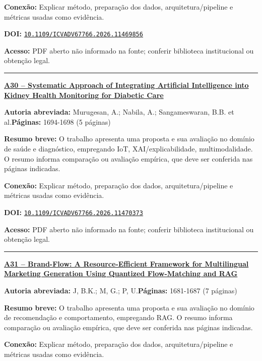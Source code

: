 \documentclass[10pt,a4paper]{article}
\begin{document}
\textbf{Conexão:} Explicar método, preparação dos dados, arquitetura/pipeline e métricas usadas como evidência.\par
\textbf{DOI:} \href{https://doi.org/10.1109/ICVADV67766.2026.11469856}{\nolinkurl{10.1109/ICVADV67766.2026.11469856}}\par
\textbf{Acesso:} PDF aberto não informado na fonte; conferir biblioteca institucional ou obtenção legal.\par
\noindent\rule{\textwidth}{0.35pt}
\par\medskip\noindent
{\large\bfseries\href{https://doi.org/10.1109/ICVADV67766.2026.11470373}{A30 -- Systematic Approach of Integrating Artificial Intelligence into Kidney Health Monitoring for Diabetic Care}}\par\smallskip
\textbf{Autoria abreviada:} Murugesan, A.; Nabila, A.; Sangameswaran, B.B. et al.\quad \textbf{Páginas:} 1694-1698 (5 páginas)\par
\textbf{Resumo breve:} O trabalho apresenta uma proposta e sua avaliação no domínio de saúde e diagnóstico, empregando IoT, XAI/explicabilidade, multimodalidade. O resumo informa comparação ou avaliação empírica, que deve ser conferida nas páginas indicadas.\par
\textbf{Conexão:} Explicar método, preparação dos dados, arquitetura/pipeline e métricas usadas como evidência.\par
\textbf{DOI:} \href{https://doi.org/10.1109/ICVADV67766.2026.11470373}{\nolinkurl{10.1109/ICVADV67766.2026.11470373}}\par
\textbf{Acesso:} PDF aberto não informado na fonte; conferir biblioteca institucional ou obtenção legal.\par
\noindent\rule{\textwidth}{0.35pt}
\par\medskip\noindent
{\large\bfseries\href{https://doi.org/10.1109/ICVADV67766.2026.11469847}{A31 -- Brand-Flow: A Resource-Efficient Framework for Multilingual Marketing Generation Using Quantized Flow-Matching and RAG}}\par\smallskip
\textbf{Autoria abreviada:} J, B.K.; M, G.; P, U.\quad \textbf{Páginas:} 1681-1687 (7 páginas)\par
\textbf{Resumo breve:} O trabalho apresenta uma proposta e sua avaliação no domínio de recomendação e comportamento, empregando RAG. O resumo informa comparação ou avaliação empírica, que deve ser conferida nas páginas indicadas.\par
\textbf{Conexão:} Explicar método, preparação dos dados, arquitetura/pipeline e métricas usadas como evidência.\par
\end{document}
